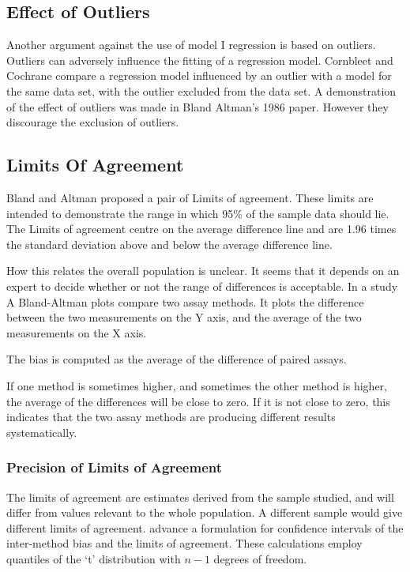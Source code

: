 \documentclass[12pt, a4paper]{report}
\theoremstyle{plain}
\theoremstyle{definition}
\theoremstyle{remark}
\begin{document}
	\subsection{Effect of Outliers} Another argument against
	the use of model I regression is based on outliers. Outliers can
	adversely influence the fitting of a regression model. Cornbleet
	and Cochrane compare a regression model influenced by an outlier
	with a model for the same data set, with the outlier excluded from
	the data set. A demonstration of the effect of outliers was made
	in Bland Altman's 1986 paper. However they discourage the
	exclusion of outliers.
	
	\subsection{Limits Of Agreement}
	Bland and Altman proposed a pair of Limits of agreement. These
	limits are intended to demonstrate the range in which 95\% of the
	sample data should lie. The Limits of agreement centre on the
	average difference line and are 1.96 times the standard deviation
	above and below the average difference line.
	
	How this relates the overall population is unclear. It seems that
	it depends on an expert to decide whether or not the range of
	differences is acceptable. In a study A Bland-Altman plots compare
	two assay methods. It plots the difference between the two
	measurements on the Y axis, and the average of the two
	measurements on the X axis.
	
	The bias is computed as the average of the difference of paired
	assays.
	
	If one method is sometimes higher, and sometimes the other method
	is higher, the average of the differences will be close to zero.
	If it is not close to zero, this indicates that the two assay
	methods are producing different results systematically.
	
	\subsubsection{Precision of Limits of Agreement}
	The limits of agreement are estimates derived from the sample
	studied, and will differ from values relevant to the whole
	population. A different sample would give different limits of
	agreement. \citet*{BA86} advance a formulation for confidence
	intervals of the inter-method bias and the limits of agreement.
	These calculations employ quantiles of the `t' distribution with
	$n -1$ degrees of freedom.
	
\end{document}
